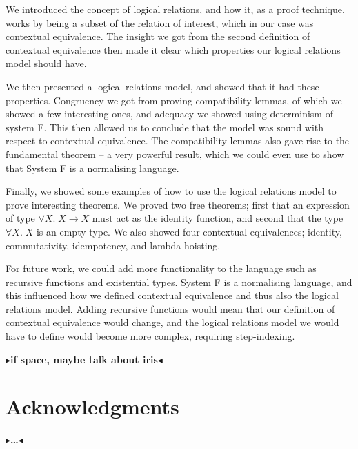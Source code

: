 \documentclass[twoside,11pt,openright]{report}
\theoremstyle{definition}
\newcommand{\Tvar}{X}
\newcommand{\Tfunc}[2]{#1 \rightarrow #2}
\newcommand{\Tall}[2]{\forall #1.\; #2}
\newcommand{\todo}[1]{{\color[rgb]{.5,0,0}\textbf{$\blacktriangleright$#1$\blacktriangleleft$}}}
\begin{document}
We introduced the concept of logical relations, and how it, as a proof technique, works by being a subset of the relation of interest, which in our case was contextual equivalence. The insight we got from the second definition of contextual equivalence then made it clear which properties our logical relations model should have.

We then presented a logical relations model, and showed that it had these properties. Congruency we got from proving compatibility lemmas, of which we showed a few interesting ones, and adequacy we showed using determinism of system F. This then allowed us to conclude that the model was sound with respect to contextual equivalence. The compatibility lemmas also gave rise to the fundamental theorem – a very powerful result, which we could even use to show that System F is a normalising language.

Finally, we showed some examples of how to use the logical relations model to prove interesting theorems. We proved two free theorems; first that an expression of type $\Tall{\Tvar}{\Tfunc{\Tvar}{\Tvar}}$ must act as the identity function, and second that the type $\Tall{\Tvar}{\Tvar}$ is an empty type. We also showed four contextual equivalences; identity, commutativity, idempotency, and lambda hoisting.

For future work, we could add more functionality to the language such as recursive functions and existential types. System F is a normalising language, and this influenced how we defined contextual equivalence and thus also the logical relations model. Adding recursive functions would mean that our definition of contextual equivalence would change, and the logical relations model we would have to define would become more complex, requiring step-indexing.

\todo{if space, maybe talk about iris}



\chapter*{Acknowledgments}

\todo{\dots}


\cleardoublepage
{}
 

\end{document}
